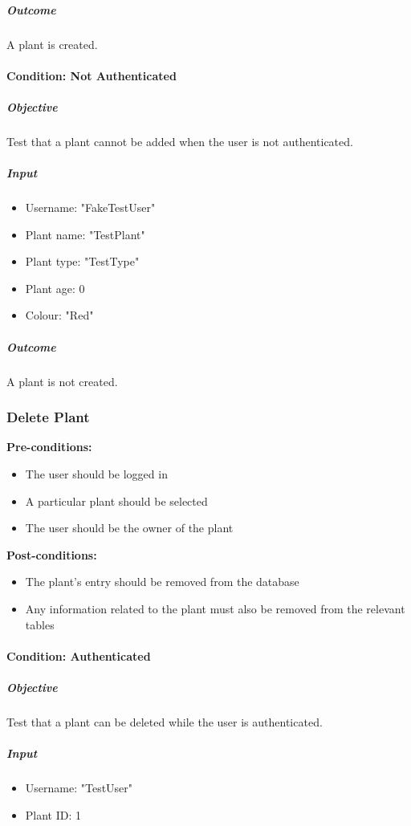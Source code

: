\documentclass{article}
\begin{document}
		\subparagraph{Outcome}
		A plant is created.
		
		\paragraph{Condition: Not Authenticated}
		\subparagraph{Objective}
		Test that a plant cannot be added when the user is not authenticated.
		
		\subparagraph{Input}
		\begin{itemize}
			\item Username: "FakeTestUser"
			\item Plant name: "TestPlant"
			\item Plant type: "TestType"
			\item Plant age: 0
			\item Colour: "Red"
		\end{itemize}
		
		\subparagraph{Outcome}
		A plant is not created.
		
		\subsubsection{Delete Plant}
		
		\textbf{Pre-conditions:}
		\begin{itemize}
			\item The user should be logged in
			\item A particular plant should be selected
			\item The user should be the owner of the plant
		\end{itemize}
		\textbf{Post-conditions:}
		\begin{itemize}
			\item The plant's entry should be removed from the database
			\item Any information related to the plant must also be removed from the relevant tables
		\end{itemize}
		
		\paragraph{Condition: Authenticated}
		\subparagraph{Objective}
		Test that a plant can be deleted while the user is authenticated.
		
		\subparagraph{Input}
		\begin{itemize}
			\item Username: "TestUser"
			\item Plant ID: 1
		\end{itemize}
		
\end{document}
